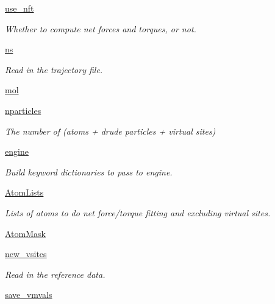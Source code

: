 \begin{DoxyCompactItemize}
\item 
\hyperlink{classforcebalance_1_1abinitio_1_1AbInitio_afd8d179560a295ffa6c6309843c59279}{use\-\_\-nft}
\begin{DoxyCompactList}\small\item\em Whether to compute net forces and torques, or not. \end{DoxyCompactList}\item 
\hyperlink{classforcebalance_1_1abinitio_1_1AbInitio_a1e8248e2efe952362b1b21462a70b540}{ns}
\begin{DoxyCompactList}\small\item\em Read in the trajectory file. \end{DoxyCompactList}\item 
\hyperlink{classforcebalance_1_1abinitio_1_1AbInitio_ace30686ab072c0520154d15855c5e885}{mol}
\item 
\hyperlink{classforcebalance_1_1abinitio_1_1AbInitio_aef3798e4666b91ecc4c526b679eb4908}{nparticles}
\begin{DoxyCompactList}\small\item\em The number of (atoms + drude particles + virtual sites) \end{DoxyCompactList}\item 
\hyperlink{classforcebalance_1_1abinitio_1_1AbInitio_a34058fdf49b7b3b8f1fea78dd30f3209}{engine}
\begin{DoxyCompactList}\small\item\em Build keyword dictionaries to pass to engine. \end{DoxyCompactList}\item 
\hyperlink{classforcebalance_1_1abinitio_1_1AbInitio_a7e62a74e820ac0c5dd67f49155b95c41}{Atom\-Lists}
\begin{DoxyCompactList}\small\item\em Lists of atoms to do net force/torque fitting and excluding virtual sites. \end{DoxyCompactList}\item 
\hyperlink{classforcebalance_1_1abinitio_1_1AbInitio_a09c8bbc29d2de7dbc471d56cbc574d5d}{Atom\-Mask}
\item 
\hyperlink{classforcebalance_1_1abinitio_1_1AbInitio_a64f1aeadac4d7b09424c20b83e5ad5af}{new\-\_\-vsites}
\begin{DoxyCompactList}\small\item\em Read in the reference data. \end{DoxyCompactList}\item 
\hyperlink{classforcebalance_1_1abinitio_1_1AbInitio_a22037bf43728fa45f387390005e0b131}{save\-\_\-vmvals}

\end{DoxyCompactItemize}
